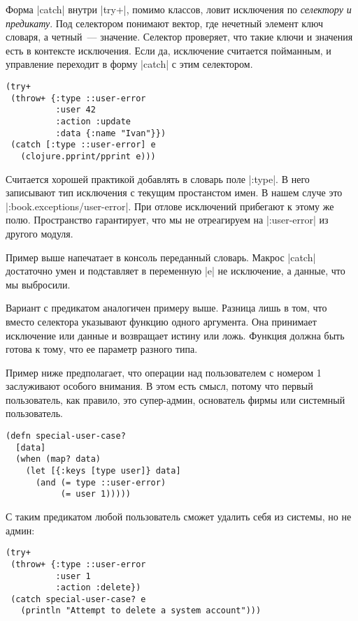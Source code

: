 Форма \spverb|catch| внутри \spverb|try+|, помимо классов, ловит исключения по \emph{селектору и
предикату}. Под селектором понимают вектор, где нечетный элемент ключ словаря,
а четный~--- значение. Селектор проверяет, что такие ключи и значения есть в
контексте исключения. Если да, исключение считается пойманным, и управление
переходит в форму \spverb|catch| с этим селектором.

\begin{verbatim}
(try+
 (throw+ {:type ::user-error
          :user 42
          :action :update
          :data {:name "Ivan"}})
 (catch [:type ::user-error] e
   (clojure.pprint/pprint e)))
\end{verbatim}

Считается хорошей практикой добавлять в словарь поле \spverb|:type|. В него записывают
тип исключения с текущим простанстом имен. В нашем случе это
\spverb|:book.exceptions/user-error|. При отлове исключений прибегают к этому же
полю. Пространство гарантирует, что мы не отреагируем на \spverb|:user-error| из
другого модуля.

Пример выше напечатает в консоль переданный словарь. Макрос \spverb|catch| достаточно
умен и подставляет в переменную \spverb|e| не исключение, а данные, что мы выбросили.

Вариант с предикатом аналогичен примеру выше. Разница лишь в том, что вместо
селектора указывают функцию одного аргумента. Она принимает исключение или
данные и возвращает истину или ложь. Функция должна быть готова к тому, что ее
параметр разного типа.

Пример ниже предполагает, что операции над пользователем с номером 1 заслуживают
особого внимания. В этом есть смысл, потому что первый пользователь, как
правило, это супер-админ, основатель фирмы или системный пользователь.

\begin{verbatim}
(defn special-user-case?
  [data]
  (when (map? data)
    (let [{:keys [type user]} data]
      (and (= type ::user-error)
           (= user 1)))))
\end{verbatim}

С таким предикатом любой пользователь сможет удалить себя из системы, но не
админ:

\begin{verbatim}
(try+
 (throw+ {:type ::user-error
          :user 1
          :action :delete})
 (catch special-user-case? e
   (println "Attempt to delete a system account")))
\end{verbatim}

